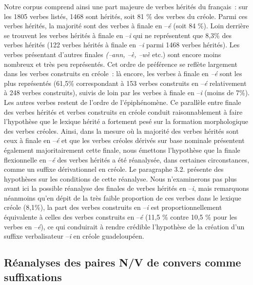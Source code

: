\documentclass[output=paper]{langsci/langscibook}
\begin{document}
Notre corpus comprend ainsi une part majeure de verbes hérités du
français~: sur les 1805 verbes listés, 1468 sont hérités, soit 81 \% des
verbes du créole. Parmi ces verbes hérités, la majorité sont des verbes
à finale en --\emph{é} (soit 84 \%). Loin derrière se trouvent les
verbes hérités à finale en --\emph{i} qui ne représentent que 8,3\% des
verbes hérités (122 verbes hérités à finale en \emph{--i} parmi 1468
verbes hérités). Les verbes présentant d'autres finales \emph{(--ann, --è,
--wè} etc.) sont encore moins nombreux et très peu représentés. Cet ordre
de préférence se reflète largement dans les verbes construits en
créole~: là encore, les verbes à finale en \emph{--é} sont les plus
représentés (61,5\% correspondant à 153 verbes construits en --\emph{é
}relativement à 248 verbes construits), suivis de loin par les verbes à
finale en --\emph{i} (moins de 7\%). Les autres verbes restent de
l'ordre de l'épiphénomène. Ce parallèle entre finale des verbes hérités
et verbes construits en créole conduit raisonnablement à faire
l'hypothèse que le lexique hérité a fortement pesé sur la formation
morphologique des verbes créoles. Ainsi, dans la mesure où la majorité
des verbes hérités sont ceux à finale en --\emph{é} et que les verbes
créoles dérivés sur base nominale présentent également majoritairement
cette finale, nous émettons l'hypothèse que la finale flexionnelle en
--\emph{é} des verbes hérités a été réanalysée, dans certaines
circonstances, comme un suffixe dérivationnel en créole. Le paragraphe
3.2. présente des hypothèses sur les conditions de cette réanalyse. Nous
n'examinerons pas plus avant ici la possible réanalyse des finales de
verbes hérités en --\emph{i}, mais remarquons néanmoins qu'en dépit de
la très faible proportion de ces verbes dans le lexique créole (8,1\%),
la part des verbes construits en --\emph{i} est proportionnellement
équivalente à celles des verbes construits en --\emph{é} (11,5 \% contre
10,5 \% pour les verbes en \mbox{--\emph{é}}), ce qui conduirait à rendre
crédible l'hypothèse de la création d'un suffixe verbalisateur
--\emph{i} en créole guadeloupéen.

\subsection{Réanalyses des paires N/V de convers comme
suffixations}\label{subsection:VilloingDeglas:réanalyses-des-paires-nv-de-convers-comme-suffixations}
\end{document}
